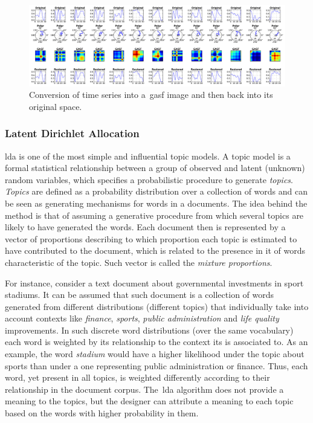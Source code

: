 \begin{figure} [htbp]
\centering
\includegraphics[width=\textwidth]{images/05-modeling/gasfpipeline} 
 \caption{Conversion of time series into a~\gls{gasf} image and then back into its original space.}
 \label{figure:gasf_example}
\end{figure}

\subsubsection{Latent Dirichlet Allocation}
\glsdesc{lda} is one of the most simple and influential topic models. A topic model is a formal statistical relationship between a group of observed and latent (unknown) random variables, which specifies a probabilistic procedure to generate \textit{topics}. \textit{Topics} are defined as a probability distribution over a collection of words and can be seen as generating mechanisms for words in a documents. The idea behind the method is that of assuming a generative procedure from which several topics are likely to have generated the words. Each document then is represented by a vector of proportions describing to which proportion each topic is estimated to have contributed to the document, which is related to the presence in it of words characteristic of the topic. Such vector is called the \textit{mixture proportions}.



For instance, consider a text document about governmental investments in sport stadiums. It can be assumed that such document is a collection of words generated from different distributions (different topics) that individually take into account contexts like \textit{finance}, \textit{sports}, \textit{public administration} and \textit{life quality} improvements. In such discrete word distributions (over the same vocabulary) each word is weighted by its relationship to the context its is associated to. As an example, the word \textit{stadium} would have a higher likelihood under the topic about sports than under a one representing public administration or finance. Thus, each word, yet present in all topics, is weighted differently according to their relationship in the document corpus. The~\acrfull{lda} algorithm does not provide a meaning to the topics, but the designer can attribute a meaning to each topic based on the words with higher probability in them.

